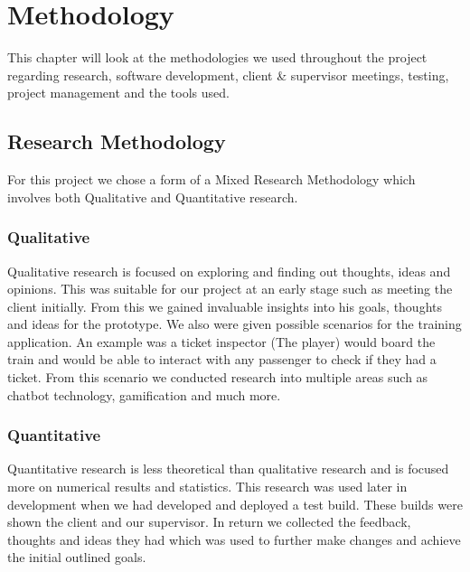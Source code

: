 \chapter{Methodology}
This chapter will look at the methodologies we used throughout the project regarding research, software development, client \& supervisor meetings, testing, project management and the tools used.

\section{Research Methodology}
For this project we chose a form of a Mixed Research Methodology which involves both Qualitative and Quantitative research. 

\subsection{Qualitative}
Qualitative research is focused on exploring and finding out thoughts, ideas and opinions. This was suitable for our project at an early stage such as meeting the client initially. From this we gained invaluable insights into his goals, thoughts and ideas for the prototype. We also were given possible scenarios for the training application. An example was a ticket inspector (The player) would board the train and would be able to interact with any passenger to check if they had a ticket. From this scenario we conducted research into multiple areas such as chatbot technology, gamification and much more. 

\subsection{Quantitative}
Quantitative research is less theoretical than qualitative research and is focused more on numerical results and statistics. This research was used later in development when we had developed and deployed a test build. These builds were shown the client and our supervisor. In return we collected the feedback, thoughts and ideas they had which was used to further make changes and achieve the initial outlined goals.

